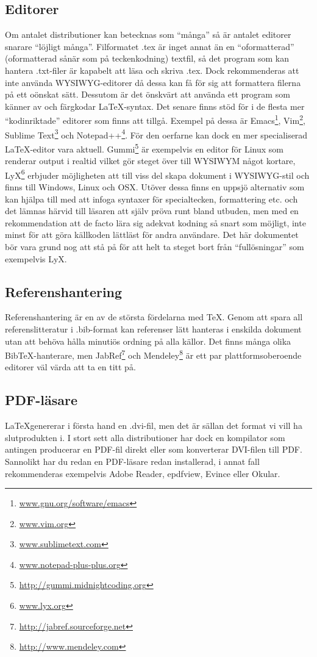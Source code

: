 \subsection{Editorer}
Om antalet distributioner kan betecknas som ``många'' så är antalet editorer snarare ``löjligt många''. Filformatet .tex är inget annat än en ``oformatterad'' (oformatterad sånär som på teckenkodning) textfil, så det program som kan hantera .txt-filer är kapabelt att läsa och skriva .tex. Dock rekommenderas att inte använda WYSIWYG-editorer då dessa kan få för sig att formattera filerna på ett oönskat sätt. Dessutom är det önskvärt att använda ett program som känner av och färgkodar \LaTeX-syntax. Det senare finns stöd för i de flesta mer ``kodinriktade'' editorer som finns att tillgå. Exempel på dessa är Emacs\footnote{\url{www.gnu.org/software/emacs}}, Vim\footnote{\url{www.vim.org}}, Sublime Text\footnote{\url{www.sublimetext.com}} och Notepad++\footnote{\url{www.notepad-plus-plus.org}}. För den oerfarne kan dock en mer specialiserad \LaTeX-editor vara aktuell.
Gummi\footnote{\url{http://gummi.midnightcoding.org}} är exempelvis en editor för Linux som renderar output i realtid vilket gör steget över till WYSIWYM något kortare, LyX\footnote{\url{www.lyx.org}} erbjuder möjligheten att till viss del skapa dokument i WYSIWYG-stil och finns till Windows, Linux och OSX. Utöver dessa finns en uppsjö alternativ som kan hjälpa till med att infoga syntaxer för specialtecken, formattering etc. och det lämnas härvid till läsaren att själv pröva runt bland utbuden, men med en rekommendation att de facto lära sig adekvat kodning så snart som möjligt, inte minst för att göra källkoden lättläst för andra användare. Det här dokumentet bör vara grund nog att stå på för att helt ta steget bort från ``fullösningar'' som exempelvis LyX.

\subsection{Referenshantering}\label{sec:refsoft}
Referenshantering är en av de största fördelarna med \TeX. Genom att spara all referenslitteratur i .bib-format kan referenser lätt hanteras i enskilda dokument utan att behöva hålla minutiös ordning på alla källor. Det finns många olika BibTeX-hanterare, men JabRef\footnote{\url{http://jabref.sourceforge.net}} och Mendeley\footnote{\url{http://www.mendeley.com}} är ett par plattformsoberoende editorer väl värda att ta en titt på.

\subsection{PDF-läsare}
\LaTeX genererar i första hand en .dvi-fil, men det är sällan det format vi vill ha slutprodukten i. I stort sett alla distributioner har dock en kompilator som antingen producerar en PDF-fil direkt eller som konverterar DVI-filen till PDF. Sannolikt har du redan en PDF-läsare redan installerad, i annat fall rekommenderas exempelvis Adobe Reader, epdfview, Evince eller Okular.

